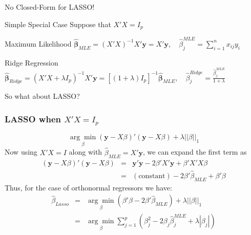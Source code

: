 \begin{frame}
  {No Closed-Form for LASSO!}

  \small

  \begin{block}{Simple Special Case}
  Suppose that $X'X = I_p$
\end{block}
\begin{block}{Maximum Likelihood}
    $\widehat{\boldsymbol{\beta}}_{MLE} = (X'X)^{-1}X'\mathbf{y} = X'\mathbf{y}, \quad \widehat{\beta}_j^{MLE} = \sum_{i=1}^n x_{ij}y_i$ 
  \end{block}

  \begin{block}{Ridge Regression}
    $\widehat{\boldsymbol{\beta}}_{Ridge} = (X'X + \lambda I_p)^{-1}X'\mathbf{y} = \left[ (1 + \lambda) I_p \right]^{-1} \widehat{\boldsymbol{\beta}}_{MLE},\quad \widehat{\beta}^{Ridge}_j = \displaystyle \frac{\widehat{\beta}^{MLE}_j}{1 + \lambda}$
  \end{block}

  \begin{alertblock}{So what about LASSO?}
  \end{alertblock}
\end{frame}
\begin{frame}
  \frametitle{LASSO when $X'X= I_p$}
	$$\underset{\beta}{\arg \min} (\mathbf{y}  - X\beta)' (\mathbf{y} - X\beta) + \lambda \left| \left| \beta\right| \right|_1$$
Now using $X'X = I$ along with $\widehat{\beta}_{MLE} = X'\textbf{y}$, we can expand the first term as
	\begin{eqnarray*}
		 (\mathbf{y}  - X\beta)' (\mathbf{y} - X\beta) &=& \mathbf{y}'\mathbf{y} - 2\beta' X' \mathbf{y} + \beta' X'X \beta \\
		 	&=& (\mbox{constant}) - 2\beta' \widehat{\beta}_{MLE} + \beta'\beta
	\end{eqnarray*}
Thus, for the case of orthonormal regressors we have:
\begin{eqnarray*}
	\widehat{\beta}_{Lasso} &=& \underset{\beta}{\arg \min} (\beta'\beta - 2\beta' \widehat{\beta}_{MLE})  +  \lambda \left| \left| \beta\right| \right|_1\\
		&=& \underset{\beta}{\arg \min}  \sum_{j=1}^p \left(\beta_j^2 - 2 \beta_j \widehat{\beta}^{MLE}_j + \lambda\left|\beta_j \right|\right)
\end{eqnarray*}
  
\end{frame}
